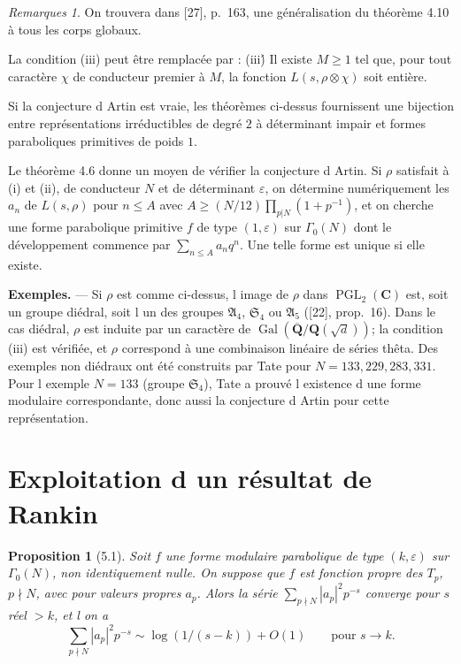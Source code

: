 \documentclass[11pt]{amsart}
\theoremstyle{plain}
\newtheorem{proposition}[theoreme]{Proposition}
\theoremstyle{definition}
\theoremstyle{remark}
\newtheorem{remarques}[theoreme]{Remarques}
\DeclareMathOperator{\Gal}{Gal}
\DeclareMathOperator{\PGL}{PGL}
\newcommand{\Q}{\mathbf{Q}}
\newcommand{\C}{\mathbf{C}}
\begin{document}
\begin{remarques}
\item[4.11.] On trouvera dans [27], p.~163, une g\'en\'eralisation du th\'eor\`eme 4.10 \`a tous les corps globaux.
\item[4.12.] La condition (iii) peut \^etre remplac\'ee par : (iii\'){} Il existe $M \ge 1$ tel que, pour tout caract\`ere $\chi$ de conducteur premier \`a $M$, la fonction $L(s, \rho \otimes \chi)$ soit enti\`ere.
\item[4.13.] Si la conjecture d Artin est vraie, les th\'eor\`emes ci-dessus fournissent une bijection entre repr\'esentations irr\'eductibles de degr\'e $2$ \`a d\'eterminant impair et formes paraboliques primitives de poids $1$.
\item[4.14.] Le th\'eor\`eme 4.6 donne un moyen de v\'erifier la conjecture d Artin. Si $\rho$ satisfait \`a (i) et (ii), de conducteur $N$ et de d\'eterminant $\varepsilon$, on d\'etermine num\'eriquement les $a_n$ de $L(s, \rho)$ pour $n \le A$ avec $A \ge (N/12) \prod_{p|N} (1 + p^{-1})$, et on cherche une forme parabolique primitive $f$ de type $(1, \varepsilon)$ sur $\Gamma_0(N)$ dont le d\'eveloppement commence par $\sum_{n \le A} a_n q^n$. Une telle forme est unique si elle existe.
\end{remarques}

\textbf{Exemples.} --- Si $\rho$ est comme ci-dessus, l image de $\rho$ dans $\PGL_2(\C)$ est, soit un groupe di\'edral, soit l un des groupes $\mathfrak{A}_4$, $\mathfrak{S}_4$ ou $\mathfrak{A}_5$ ([22], prop.~16). Dans le cas di\'edral, $\rho$ est induite par un caract\`ere de $\Gal(\overline{\Q}/\Q(\sqrt{d}))$; la condition (iii) est v\'erifi\'ee, et $\rho$ correspond \`a une combinaison lin\'eaire de s\'eries th\^eta. Des exemples non di\'edraux ont \'et\'e construits par Tate pour $N = 133, 229, 283, 331$.
Pour l exemple $N = 133$ (groupe $\mathfrak{S}_4$), Tate a prouv\'e l existence d une forme modulaire correspondante, donc aussi la conjecture d Artin pour cette repr\'esentation.

\section{Exploitation d un r\'esultat de Rankin}

\begin{proposition}[5.1]
Soit $f$ une forme modulaire parabolique de type $(k,\varepsilon)$ sur $\Gamma_0(N)$, non identiquement nulle. On suppose que $f$ est fonction propre des $T_p$, $p \nmid N$, avec pour valeurs propres $a_p$. Alors la s\'erie $\sum_{p \nmid N} |a_p|^2 p^{-s}$ converge pour $s$ r\'eel $> k$, et l on a
\begin{equation}\label{eq:rankin}\sum_{p \nmid N} |a_p|^2 p^{-s} \sim \log(1/(s-k)) + O(1) \qquad \text{pour } s \to k.\end{equation}
\end{proposition}
\end{document}
